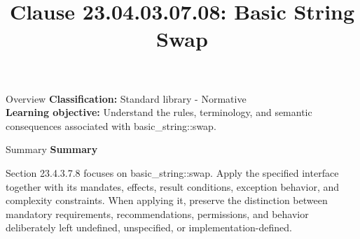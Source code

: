 \documentclass[10pt,letterpaper]{article}
\title{Clause 23.04.03.07.08: Basic String Swap}
\author{}
\date{}
\begin{document}
\maketitle
\begin{CornellOverviewBox}{Overview}
\textbf{Classification:} Standard library - Normative\\[2pt]
\textbf{Learning objective:} Understand the rules, terminology, and semantic consequences associated with basic\_string::swap.
\end{CornellOverviewBox}\begin{CornellSummaryBox}{Summary}
{\sffamily\bfseries\color{Accent} Summary}\par\vspace{3pt}Section 23.4.3.7.8 focuses on basic\_string::swap. Apply the specified interface together with its mandates, effects, result conditions, exception behavior, and complexity constraints. When applying it, preserve the distinction between mandatory requirements, recommendations, permissions, and behavior deliberately left undefined, unspecified, or implementation-defined.
\end{CornellSummaryBox}
\end{document}
